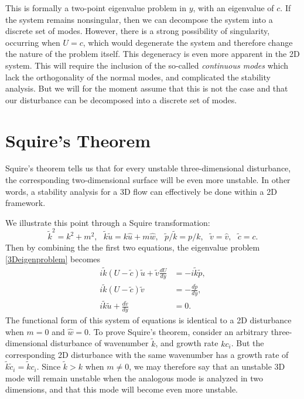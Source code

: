 \documentclass[letterpaper, 11pt, onecolumn]{article}
\begin{document}
This is formally a two-point eigenvalue problem in $y$, with an eigenvalue of $c$. If the system remains nonsingular, then we can decompose the system into a discrete set of modes. However, there is a strong possibility of singularity, occurring when $U = c$, which would degenerate the system and therefore change the nature of the problem itself. This degeneracy is even more apparent in the 2D system. This will require the inclusion of the so-called \emph{continuous modes} which lack the orthogonality of the normal modes, and complicated the stability analysis. But we will for the moment assume that this is not the case and that our disturbance can be decomposed into a discrete set of modes.

\section{Squire's Theorem}\label{SquiresThm}

Squire's theorem tells us that for every unstable three-dimensional disturbance, the corresponding two-dimensional surface will be even more unstable. In other words, a stability analysis for a 3D flow can effectively be done within a 2D framework.

We illustrate this point through a Squire transformation:
\begin{equation*}
\tilde{k}^2 = k^2 + m^2, \ \ \ \tilde{k} \tilde{u} = k \hat{u} + m \hat{w}, \ \ \ \tilde{p} / \tilde{k} = p / k, \ \ \ \tilde{v} = \hat{v}, \ \ \ \tilde{c} = c.
\end{equation*}
Then by combining the the first two equations, the eigenvalue problem \eqref{3Deigenproblem} becomes
\begin{subequations}
\begin{align}
i \tilde{k} (U - \tilde{c}) \tilde{u} + \tilde{v} \frac{dU}{dy} &= - i \tilde{k} \tilde{p}, \\
i \tilde{k} (U - \tilde{c}) \tilde{v} &= - \frac{d\tilde{p}}{dy}, \\
i \tilde{k} \tilde{u} + \frac{d \tilde{v}}{d y} &= 0.
\end{align}
\end{subequations}
The functional form of this system of equations is identical to a 2D disturbance when $m = 0$ and $\hat{w} = 0$. To prove Squire's theorem, consider an arbitrary three-dimensional disturbance of wavenumber $\tilde{k}$, and growth rate $k c_i$. But the corresponding 2D disturbance with the same wavenumber has a growth rate of $\tilde{k} \tilde{c}_i = \tilde{k} c_i$. Since $\tilde{k} > k$ when $m \neq 0$, we may therefore say that an unstable 3D mode will remain unstable when the analogous mode is analyzed in two dimensions, and that this mode will become even more unstable.
\end{document}
